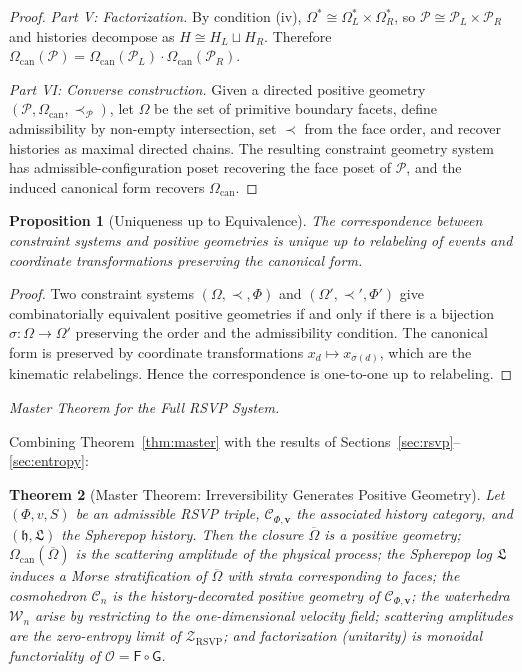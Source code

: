 \documentclass[11pt]{article}
\theoremstyle{plain}
\newtheorem{theorem}{Theorem}[section]
\newtheorem{proposition}[theorem]{Proposition}
\theoremstyle{definition}
\theoremstyle{remark}
\newcommand{\Phif}{\Phi}
\newcommand{\vf}{v}
\newcommand{\Sf}{S}
\newcommand{\OmKS}{\Omega}
\newcommand{\hist}{\mathfrak{h}}
\newcommand{\Log}{\mathfrak{L}}
\newcommand{\Cosmo}{\mathcal{C}_n}
\newcommand{\Water}{\mathcal{W}_n}
\newcommand{\CF}{\Omega_{\mathrm{can}}}
\newcommand{\Ccat}{\mathcal{C}_{\Phi,\mathbf{v}}}
\newcommand{\Gfun}{\mathsf{G}}
\newcommand{\Ffun}{\mathsf{F}}
\newcommand{\Ofun}{\mathcal{O}}
\newcommand{\ZRSVP}{\mathcal{Z}_{\mathrm{RSVP}}}
\begin{document}
\begin{proof}
\textit{Part V: Factorization.} By condition (iv), $\OmKS^* \cong \OmKS_L^* \times \OmKS_R^*$, so $\mathcal{P} \cong \mathcal{P}_L \times \mathcal{P}_R$ and histories decompose as $H \cong H_L \sqcup H_R$. Therefore $\CF(\mathcal{P}) = \CF(\mathcal{P}_L) \cdot \CF(\mathcal{P}_R)$.

\textit{Part VI: Converse construction.} Given a directed positive geometry $(\mathcal{P}, \CF, \prec_{\mathcal{P}})$, let $\OmKS$ be the set of primitive boundary facets, define admissibility by non-empty intersection, set $\prec$ from the face order, and recover histories as maximal directed chains. The resulting constraint geometry system has admissible-configuration poset recovering the face poset of $\mathcal{P}$, and the induced canonical form recovers $\CF$.
\end{proof}

\begin{proposition}[Uniqueness up to Equivalence]
The correspondence between constraint systems and positive geometries is unique up to relabeling of events and coordinate transformations preserving the canonical form.
\end{proposition}

\begin{proof}
Two constraint systems $(\OmKS, \prec, \Phif)$ and $(\OmKS', \prec', \Phif')$ give combinatorially equivalent positive geometries if and only if there is a bijection $\sigma: \OmKS \to \OmKS'$ preserving the order and the admissibility condition. The canonical form is preserved by coordinate transformations $x_d \mapsto x_{\sigma(d)}$, which are the kinematic relabelings. Hence the correspondence is one-to-one up to relabeling.
\end{proof}

\medskip\noindent\textit{Master Theorem for the Full RSVP System.}

Combining Theorem~\ref{thm:master} with the results of Sections~\ref{sec:rsvp}--\ref{sec:entropy}:

\begin{theorem}[Master Theorem: Irreversibility Generates Positive Geometry]
Let $(\Phif, \vf, \Sf)$ be an admissible RSVP triple, $\Ccat$ the associated history category, and $(\hist, \Log)$ the Spherepop history. Then the closure $\overline{\OmKS}$ is a positive geometry; $\CF(\overline{\OmKS})$ is the scattering amplitude of the physical process; the Spherepop log $\Log$ induces a Morse stratification of $\overline{\OmKS}$ with strata corresponding to faces; the cosmohedron $\Cosmo$ is the history-decorated positive geometry of $\Ccat$; the waterhedra $\Water$ arise by restricting to the one-dimensional velocity field; scattering amplitudes are the zero-entropy limit of $\ZRSVP$; and factorization (unitarity) is monoidal functoriality of $\Ofun = \Ffun \circ \Gfun$.
\end{theorem}
\end{document}
